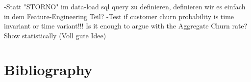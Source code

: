 \documentclass[12pt,titlepage]{article}
\begin{document}
-Statt "STORNO" im data-load sql query zu definieren, definieren wir es einfach in dem Feature-Engineering Teil?
-Test if customer churn probability is time invariant or time variant!!! Is it enough to argue with the Aggregate Churn rate? Show statistically (Voll gute Idee)

\newpage

\thispagestyle{empty}

\section*{Bibliography}
\vspace*{6mm}
\end{document}
